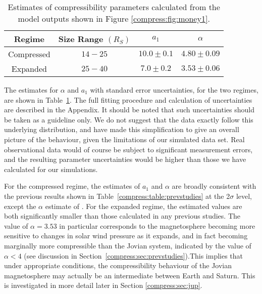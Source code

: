 \begin{table}
\caption[Estimates of compressibility parameters for this study.]{Estimates of compressibility parameters calculated from the model outputs shown in Figure \ref{compress:fig:money1}.}\label{compress:table:money1}
\centering
\begin{tabular}{c c c c}
\hline
Regime & Size Range $(\si{R_S})$ & $a_1$ & $\alpha$   \\
\hline
Compressed & $14 - 25 $ & $10.0 \pm 0.1  $ & $4.80 \pm 0.09$ \\
Expanded & $25 - 40 $ & $7.0 \pm 0.2$ & $3.53 \pm 0.06$ \\
\hline
\end{tabular}
\end{table}
The estimates for $\alpha$ and $a_1$ with standard error uncertainties, for the two regimes, are shown in Table~\ref{compress:table:money1}. The full fitting procedure and calculation of uncertainties are described in the Appendix. It should be noted that such uncertainties should be taken as a guideline only. We do not suggest that the data exactly follow this underlying distribution, and have made this simplification to give an overall picture of the behaviour, given the limitations of our simulated data set. Real observational data would of course be subject to significant measurement errors, and the resulting parameter uncertainties would be higher than those we have calculated for our simulations.

For the compressed regime, the estimates of $a_1$ and $\alpha$ are broadly consistent with the previous results shown in Table~\ref{compress:table:prevstudies} at the 2$\sigma$ level, except the $\alpha$ estimate of \citet{pilkington2015}. For the expanded regime, the estimated values are both significantly smaller than those calculated in any previous studies. The value of $\alpha = 3.53$ in particular corresponds to the magnetosphere becoming more sensitive to changes in solar wind pressure as it expands, and in fact becoming marginally more compressible than the Jovian system, indicated by the value of $\alpha < 4$ (see discussion in Section~\ref{compress:sec:prevstudies}).This implies that under appropriate conditions, the compressibility behaviour of the Jovian magnetosphere may actually be an intermediate between Earth and Saturn. This is investigated in more detail later in Section \ref{compress:sec:jup}.

